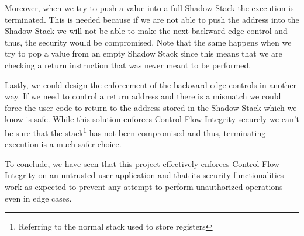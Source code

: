 Moreover, when we try to push a value into a full Shadow Stack the execution is
terminated. This is needed because if we are not able to push the address into the
Shadow Stack we will not be able to make the next backward edge control and thus,
the security would be compromised. Note that the same happens when we try to pop
a value from an empty Shadow Stack since this means that we are checking a return
instruction that was never meant to be performed.

Lastly, we could design the enforcement of the backward edge controls in another
way. If we need to control a return address and there is a mismatch we could force
the user code to return to the address stored in the Shadow Stack which we know is
safe. While this solution enforces Control Flow Integrity securely we can't be
sure that the stack\footnote{Referring to the normal stack used to store
registers} has not been compromised and thus, terminating execution is a much
safer choice.

To conclude, we have seen that this project effectively enforces Control Flow Integrity
on an untrusted user application and that its security functionalities work as expected
to prevent any attempt to perform unauthorized operations even in edge cases.
